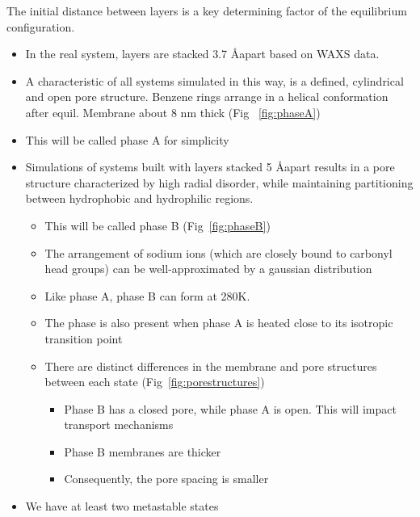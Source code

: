 \documentclass{article}
\newcommand{\angstrom}{\textup{\AA}}
\begin{document}
	The initial distance between layers is a key determining factor of the equilibrium configuration.
	\begin{itemize}
                \item In the real system, layers are stacked 3.7 \angstrom apart based on WAXS data. 
                \item A characteristic of all systems simulated in this way, is a defined, cylindrical and open pore structure. Benzene rings arrange in a helical conformation after equil. Membrane about 8 nm thick (Fig ~\ref{fig:phaseA}) %
                \item This will be called phase A for simplicity  
	        \item Simulations of systems built with layers stacked 5 \angstrom apart results in a pore structure characterized by high radial disorder, while maintaining partitioning between hydrophobic and hydrophilic regions.
        	\begin{itemize}
                	\item This will be called phase B (Fig~\ref{fig:phaseB})
                	\item The arrangement of sodium ions (which are closely bound to carbonyl head groups) can be well-approximated by a gaussian distribution 
                	\item Like phase A, phase B can form at 280K. %
                	\item The phase is also present when phase A is heated close to its isotropic transition point
                	\item There are distinct differences in the membrane and pore structures between each state (Fig~\ref{fig:porestructures})
                	\begin{itemize}
                        	\item Phase B has a closed pore, while phase A is open. This will impact transport mechanisms
                        	\item Phase B membranes are thicker
                        	\item Consequently, the pore spacing is smaller
                	\end{itemize}
		\end{itemize}
                \item We have at least two metastable states
        \end{itemize}
\end{document}
